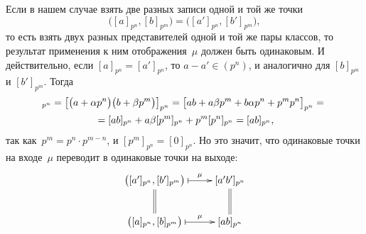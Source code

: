 \begin{proofm}
\begin{description}
			Если в нашем случае взять две разных записи одной и той же точки
			\[
				\bigl(
					[a]_{p^n}
					,
					[b]_{p^m}
				\bigr)
				=
				\bigl(
					[a']_{p^n}
					,
					[b']_{p^m}
				\bigr)
				,
			\]
			то есть взять двух разных представителей одной и той же пары классов, то результат применения к ним отображения~$\mu$ должен быть одинаковым. И действительно, если $[a]_{p^n} = [a']_{p^n}$, то $a - a' \in (p^n)$, и аналогично для $[b]_{p^m}$ и $[b']_{p^m}$. Тогда
			\begin{multline*}
				[a'b']_{p^n} =
				\bigl[
					\bigl(
						a + \alpha p^n
					\bigr)
					\bigl(
						b + \beta p^m
					\bigr)
				\bigr]_{p^n}
				=
				\bigl[
					ab +
					a\beta p^m
					+
					b\alpha p^n
					+
					p^m p^n
				\bigr]_{p^n}
				\nline{=}
				[ab]_{p^n}
				+
				a\beta [p^m]_{p^n}
				+
				p^m [p^n]_{p^n}
				=
				[ab]_{p^n}
				,
			\end{multline*}
			так как~$p^m = p^n \cdot p^{m-n}$, и $[p^m]_{p^n} = [0]_{p^n}$.
			Но это значит, что одинаковые точки на входе~$\mu$ переводит в одинаковые точки на выходе:
			\[
				\xymatrix{
					\bigl(
						[a']_{p^n}
						,
						[b']_{p^m}
					\bigr)
					\ar @{|->} [r] ^-{\mu}
					\ar @{=} [d]
					&
					[a'b']_{p^n}
					\ar @{=} [d]
					\\
					\bigl(
						[a]_{p^n}
						,
						[b]_{p^m}
					\bigr)
					\ar @{|->} [r] ^-{\mu}
					&
					[ab]_{p^n}
				}
			\]


\end{description}
\end{proofm}
